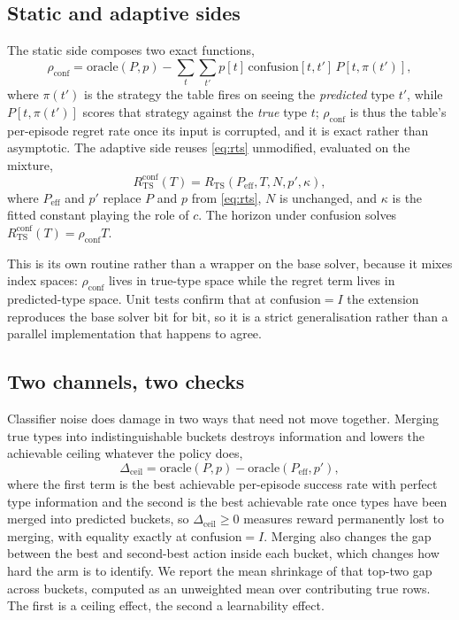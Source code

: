 \documentclass[conference]{IEEEtran}
\begin{document}
\subsection{Static and adaptive sides}

The static side composes two exact functions,
\begin{equation}
\rho_{\mathrm{conf}} = \mathrm{oracle}(P,p) - \sum_{t}\sum_{t'}
p[t]\,\mathrm{confusion}[t,t']\,P[t,\pi(t')],
\label{eq:rhoconf}
\end{equation}
where $\pi(t')$ is the strategy the table fires on seeing the \emph{predicted}
type $t'$, while $P[t,\pi(t')]$ scores that strategy against the \emph{true}
type $t$; $\rho_{\mathrm{conf}}$ is thus the table's per-episode regret rate
once its input is corrupted, and it is exact rather than asymptotic. The
adaptive side reuses \eqref{eq:rts} unmodified, evaluated on the mixture,
\begin{equation}
R^{\mathrm{conf}}_{\mathrm{TS}}(T) =
R_{\mathrm{TS}}(P_{\mathrm{eff}}, T, N, p', \kappa),
\label{eq:rtsconf}
\end{equation}
where $P_{\mathrm{eff}}$ and $p'$ replace $P$ and $p$ from \eqref{eq:rts}, $N$
is unchanged, and $\kappa$ is the fitted constant playing the role of $c$. The
horizon under confusion solves $R^{\mathrm{conf}}_{\mathrm{TS}}(T) =
\rho_{\mathrm{conf}} T$.

This is its own routine rather than a wrapper on the base solver, because it
mixes index spaces: $\rho_{\mathrm{conf}}$ lives in true-type space while the
regret term lives in predicted-type space. Unit tests confirm that at
$\mathrm{confusion} = I$ the extension reproduces the base solver bit for bit,
so it is a strict generalisation rather than a parallel implementation that
happens to agree.

\subsection{Two channels, two checks}

Classifier noise does damage in two ways that need not move together. Merging
true types into indistinguishable buckets destroys information and lowers the
achievable ceiling whatever the policy does,
\begin{equation}
\Delta_{\mathrm{ceil}} = \mathrm{oracle}(P,p) -
\mathrm{oracle}(P_{\mathrm{eff}}, p'),
\label{eq:dceil}
\end{equation}
where the first term is the best achievable per-episode success rate with
perfect type information and the second is the best achievable rate once types
have been merged into predicted buckets, so $\Delta_{\mathrm{ceil}} \geq 0$
measures reward permanently lost to merging, with equality exactly at
$\mathrm{confusion} = I$. Merging also changes the gap between the best and
second-best action inside each bucket, which changes how hard the arm is to
identify. We report the mean shrinkage of that top-two gap across buckets,
computed as an unweighted mean over contributing true rows. The first is a
ceiling effect, the second a learnability effect.
\end{document}
